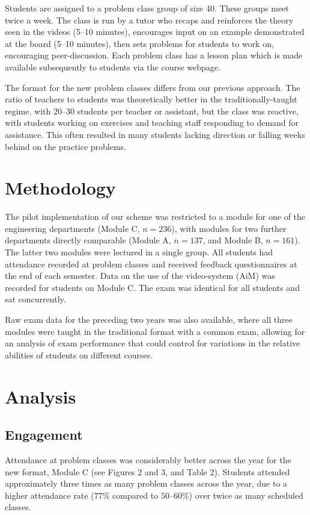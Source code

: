 \documentclass{amsart}
\begin{document}
Students are assigned to a problem class group of size 40.  These groups meet twice a week.  The class is run by a tutor who recaps and reinforces the theory seen in the videos (5--10 minutes), encourages input on an example demonstrated at the board (5--10 minutes), then sets problems for students to work on, encouraging peer-discussion.  Each problem class has a lesson plan which is made available subsequently to students via the course webpage.

The format for the new problem classes differs from our previous approach.  The ratio of teachers to students was theoretically better in the traditionally-taught regime, with 20--30 students per teacher or assistant, but the class was reactive, with students working on exercises and teaching staff responding to demand for assistance.  This often resulted in many students lacking direction or falling weeks behind on the practice problems.


\section{Methodology}

The pilot implementation of our scheme was restricted to a module for one of the engineering departments (Module C, $n=236$), with modules for two further departments directly comparable (Module A, $n=137$, and Module B, $n=161$).  The latter two modules were lectured in a single group.  All students had attendance recorded at problem classes and received feedback questionnaires at the end of each semester.  Data on the use of the video-system (AiM) was recorded for students on Module C.  The exam was identical for all students and sat concurrently.

Raw exam data for the preceding two years was also available, where all three modules were taught in the traditional format with a common exam, allowing for an analysis of exam performance that could control for variations in the relative abilities of students on different courses.

\section{Analysis}

\subsection*{Engagement}

Attendance at problem classes was considerably better across the year for the new format, Module C (see Figures 2 and 3, and Table 2).  Students attended approximately three times as many problem classes across the year, due to a higher attendance rate ($77\%$ compared to $50$--$60\%$) over twice as many scheduled classes.
\end{document}
